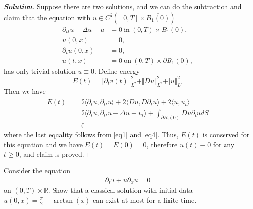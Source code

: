 \documentclass[11pt,reqno]{amsart}
\newcommand{\R}{\mathbb{R}}
\newcommand{\<}{\langle}
\renewcommand{\>}{\rangle}
\newcommand{\nnorm}[1]{\Vert#1\Vert}
\begin{document}
\begin{enumerate}[label={\arabic*.}]
\begin{proof}[\bf{Solution}]
Suppose there are two solutions, and we can do the subtraction and claim that the equation with $u\in C^2([0,T]\times \overline{B_1(0)})$
\begin{align}
\partial_{tt} u -\Delta u + u &= 0 \label{eq1} \ \text{in} \ (0,T)\times B_1(0),\\
u(0,x) &= 0 \label{eq2},\\
\partial_t u(0,x) &=0 \label{eq3},\\
u(t,x) &= 0 \label{eq4} \ \text{on}\ (0,T)\times \partial B_1(0),
\end{align} 
has only trivial solution $u\equiv 0$.
Define energy 
\begin{equation*}
E(t) = \nnorm{\partial_t u (t)}_{L^2}^2 + \nnorm{Du}_{L^2}^2 + \nnorm{u}_{L^2}^2
\end{equation*}
Then we have 
\begin{align*}
\dot{E}(t) 
&= 2 
\langle \partial_t u , \partial_{tt} u \rangle + 2 \langle Du, D \partial_t u \rangle + 2 \langle u, u_t \rangle\\
&=
2\langle \partial_t u , \partial_{tt} u -\Delta u + u_t \rangle + \int_{\partial B_1(0)}Du \partial_t u dS\\
&=
0
\end{align*}
where the last equality follows from \eqref{eq1} and \eqref{eq4}. Thus, $E(t)$ is conserved for this equation and we have $E(t) = E(0) =0$, therefore $u(t) \equiv 0$ for any $t\geq 0$, and claim is proved.
\end{proof}




\newpage
\begin{tcolorbox}
\item Consider the equation 
\begin{align*}
\partial_t u + u\partial_x u = 0
\end{align*}
on $(0,T)\times \R$. Show that a classical solution with initial data $u(0,x) =\frac{\pi}{2} - \arctan(x)$ can exist at most for a finite time.
\end{tcolorbox}
\bigskip



\end{enumerate}
\end{document}
